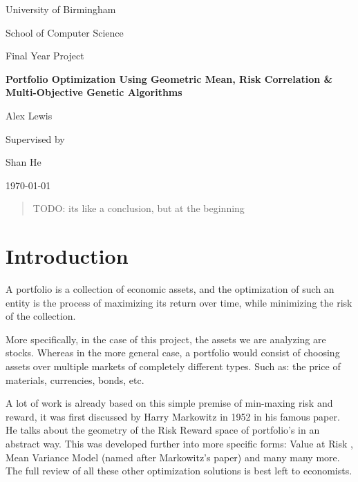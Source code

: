 \documentclass[11pt]{article}
\begin{document}
\begin{titlingpage}
    \centering\par
    {\huge University of Birmingham\par}
    {\small School of Computer Science\par}
        \vspace{0.9cm}
    {\Large Final Year Project\par}
        \vspace{0.9cm}
    {\Huge\bfseries Portfolio Optimization Using Geometric Mean, Risk Correlation 
        \& Multi-Objective Genetic Algorithms\par}
        \vspace{2.5cm}
    {\Large Alex Lewis\par}
        \vspace{0.9cm}
    {\tiny Supervised by\par}
    {\Large Shan He\par}
        \vspace{0.9cm}
    {\large \today \par}
        \vspace{0.2cm}
        \hrulefill
    \begin{abstract}
            TODO: its like a conclusion, but at the beginning
    \end{abstract}
\end{titlingpage}

\section{Introduction}

    A portfolio is a collection of economic assets, and the optimization of such an
    entity is the process of maximizing its return over time, while minimizing the
    risk of the collection.

    More specifically, in the case of this project, the assets we are analyzing are
    stocks. Whereas in the more general case, a portfolio would consist of choosing
    assets over multiple markets of completely different types. Such as: the price of 
    materials, currencies, bonds, etc. 

    A lot of work is already based on this simple premise of min-maxing risk and
    reward, it was first discussed by Harry Markowitz in 1952 \cite{Markowitz}
    in his famous paper. He talks about the geometry of the Risk Reward space
    of portfolio's in an abstract way. This was developed further into more specific
    forms: Value at Risk \cite{ValueAtRisk, Ghaoui}, Mean Variance Model (named
    after Markowitz's paper) \cite{Markowitz, Robert, SidWard} and many many more.
    The full review of all these other optimization solutions is best left
    to economists.
\end{document}
